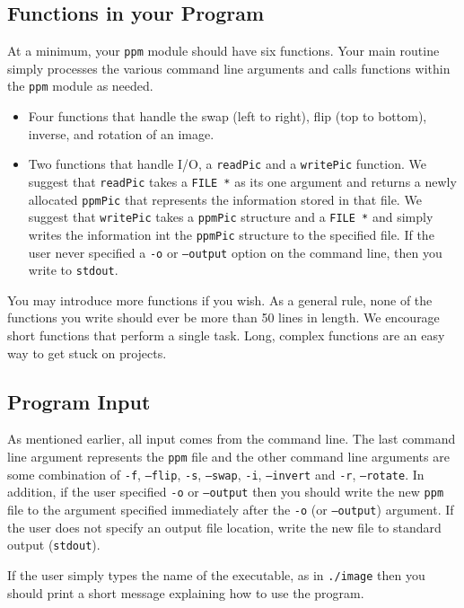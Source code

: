 \documentclass[12pt]{article}
\begin{document}
\subsection*{Functions in your Program}

At a minimum, your {\tt ppm} module should have six functions.  Your main
routine simply processes the various command line arguments and calls functions within
the {\tt ppm} module as needed.

\begin{itemize}
\item Four functions that handle the swap (left to right), flip (top to bottom),
inverse, and rotation of an image.
\item Two functions that handle I/O, a {\tt readPic} and a {\tt writePic} function.
We suggest that {\tt readPic} takes a {\tt FILE *} as its one argument and
returns a newly allocated {\tt ppmPic} that represents the information stored
in that file.
We suggest that {\tt writePic} takes a {\tt ppmPic} structure and a {\tt FILE *}
and simply writes the information int the {\tt ppmPic} structure to the specified
file.  If the user never specified a {\tt -o} or {\tt --output} option on the
command line, then you write to {\tt stdout}.
\end{itemize}

You may introduce more functions if you wish.  As a general rule, none of the
functions you write should ever be more than 50 lines in length.  We encourage
short functions that perform a single task.  Long, complex functions are an
easy way to get stuck on projects.

\subsection*{Program Input}

As mentioned earlier, all input comes from the command line.  The last command
line argument represents the {\tt ppm} file and the other command line arguments
are some combination of {\tt -f}, {\tt --flip},
{\tt -s}, {\tt --swap}, {\tt -i}, {\tt --invert}
and {\tt -r}, {\tt --rotate}.
In addition, if the user specified {\tt -o} or {\tt --output} then you should
write the new {\tt ppm} file to the argument specified immediately after the
{\tt -o} (or {\tt --output}) argument.  If the user does not specify an output
file location, write the new file to standard output ({\tt stdout}).

If the user simply types the name of the executable, as in {\tt ./image} then 
you should print a short message explaining how to use the program.
\end{document}
